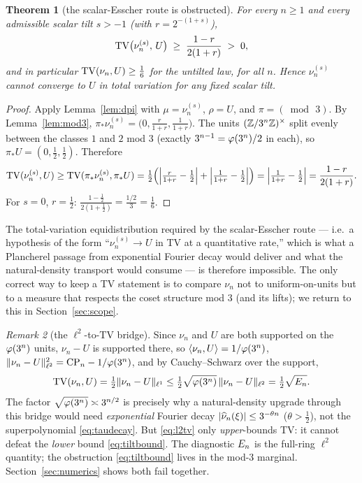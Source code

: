 \documentclass[11pt]{amsart}
\newtheorem{theorem}{Theorem}[section]
\theoremstyle{definition}
\theoremstyle{remark}
\newtheorem{remark}[theorem]{Remark}
\begin{document}
\begin{theorem}[the scalar-Esscher route is obstructed]\label{thm:obstruction}
For every $n\ge1$ and every admissible scalar tilt $s>-1$ (with $r=2^{-(1+s)}$),
\begin{equation}
   \mathrm{TV}\big(\nu_n^{(s)},\,U\big)\;\ge\;\frac{1-r}{2(1+r)}\;>\;0,
   \label{eq:tiltbound}
\end{equation}
and in particular $\mathrm{TV}(\nu_n,U)\ge\tfrac16$ for the untilted law, for all $n$. Hence $\nu_n^{(s)}$ cannot
converge to $U$ in total variation for any fixed scalar tilt.
\end{theorem}
\begin{proof}
Apply Lemma~\ref{lem:dpi} with $\mu=\nu_n^{(s)}$, $\rho=U$, and $\pi=(\bmod\,3)$. By
Lemma~\ref{lem:mod3}, $\pi_*\nu_n^{(s)}=\big(0,\tfrac{r}{1+r},\tfrac{1}{1+r}\big)$. The units
$(\mathbb{Z}/3^{n}\mathbb{Z})^{\times}$ split evenly between the classes $1$ and $2$ mod $3$ (exactly $3^{n-1}=\varphi(3^n)/2$ in
each), so $\pi_* U=(0,\tfrac12,\tfrac12)$. Therefore
\[
  \mathrm{TV}(\nu_n^{(s)},U)\ge\mathrm{TV}(\pi_*\nu_n^{(s)},\pi_* U)
  =\tfrac12\!\left(\Big|\tfrac{r}{1+r}-\tfrac12\Big|+\Big|\tfrac{1}{1+r}-\tfrac12\Big|\right)
  =\Big|\tfrac{1}{1+r}-\tfrac12\Big|=\frac{1-r}{2(1+r)} .
\]
For $s=0$, $r=\tfrac12$: $\tfrac{1-\frac12}{2(1+\frac12)}=\tfrac{1/2}{3}=\tfrac16$.
\end{proof}

The total-variation equidistribution required by the scalar-Esscher route --- i.e.\ a hypothesis of the
form ``$\nu_n^{(s)}\to U$ in TV at a quantitative rate,'' which is what a Plancherel passage from
exponential Fourier decay would deliver and what the natural-density transport would consume --- is
therefore impossible. The only correct way to keep a TV statement is to compare $\nu_n$ not to
uniform-on-units but to a measure that respects the coset structure mod $3$ (and its lifts); we return to
this in Section~\ref{sec:scope}.

\begin{remark}[the $\ell^2$-to-TV bridge]\label{rem:bridge}
Since $\nu_n$ and $U$ are both supported on the $\varphi(3^n)$ units, $\nu_n-U$ is supported there, so
$\langle\nu_n,U\rangle=1/\varphi(3^n)$, $\|\nu_n-U\|_{\ell^2}^2=\mathrm{CP}_n-1/\varphi(3^n)$, and by Cauchy--Schwarz
over the support,
\begin{equation}
  \mathrm{TV}(\nu_n,U)=\tfrac12\|\nu_n-U\|_{\ell^1}\le\tfrac12\sqrt{\varphi(3^n)}\,\|\nu_n-U\|_{\ell^2}
  =\tfrac12\sqrt{E_n}.
  \label{eq:l2tv}
\end{equation}
The factor $\sqrt{\varphi(3^n)}\asymp 3^{n/2}$ is precisely why a natural-density upgrade through this
bridge would need \emph{exponential} Fourier decay $|\widehat{\nu}_{n}(\xi)|\le 3^{-\theta n}$ ($\theta>\tfrac12$),
not the superpolynomial \eqref{eq:taudecay}. But \eqref{eq:l2tv} only \emph{upper}-bounds TV: it cannot
defeat the \emph{lower} bound \eqref{eq:tiltbound}. The diagnostic $E_n$ is the full-ring $\ell^2$
quantity; the obstruction \eqref{eq:tiltbound} lives in the mod-$3$ marginal. Section~\ref{sec:numerics}
shows both fail together.
\end{remark}
\end{document}

